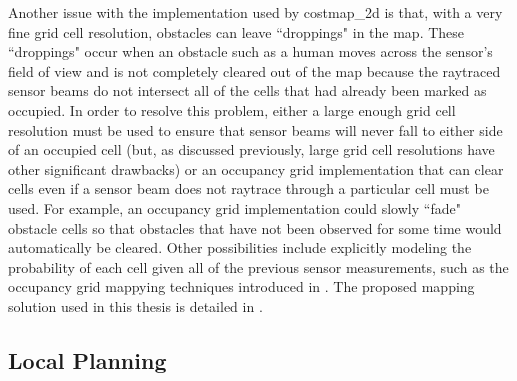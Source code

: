 Another issue with the implementation used by costmap\_2d is that, with a very fine grid cell resolution, obstacles can leave ``droppings" in the map. These ``droppings" occur when an obstacle such as a human moves across the sensor's field of view and is not completely cleared out of the map because the raytraced sensor beams do not intersect all of the cells that had already been marked as occupied. In order to resolve this problem, either a large enough grid cell resolution must be used to ensure that sensor beams will never fall to either side of an occupied cell (but, as discussed previously, large grid cell resolutions have other significant drawbacks) or an occupancy grid implementation that can clear cells even if a sensor beam does not raytrace through a particular cell must be used. For example, an occupancy grid implementation could slowly ``fade" obstacle cells so that obstacles that have not been observed for some time would automatically be cleared. Other possibilities include explicitly modeling the probability of each cell given all of the previous sensor measurements, such as the occupancy grid mappying techniques introduced in \autocite{Moravec_1985_1840}. The proposed mapping solution used in this thesis is detailed in .

\subsection{Local Planning}\label{subsec:base_local_planner}

